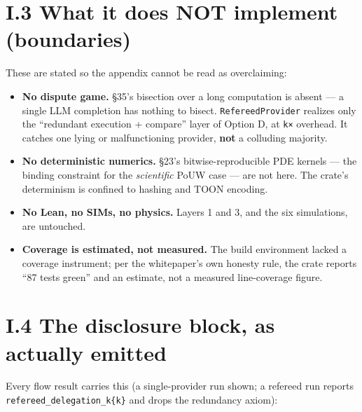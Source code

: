 \documentclass[
  11pt]{report}
\providecommand{\tightlist}{%
  \setlength{\itemsep}{0pt}\setlength{\parskip}{0pt}}
\begin{document}
\hypertarget{i.3-what-it-does-not-implement-boundaries}{%
\section{I.3 What it does NOT implement
(boundaries)}\label{i.3-what-it-does-not-implement-boundaries}}

These are stated so the appendix cannot be read as overclaiming:

\begin{itemize}
\tightlist
\item
  \textbf{No dispute game.} §35's bisection over a long computation is
  absent --- a single LLM completion has nothing to bisect.
  \texttt{RefereedProvider} realizes only the ``redundant execution +
  compare'' layer of Option D, at \texttt{k×} overhead. It catches one
  lying or malfunctioning provider, \textbf{not} a colluding majority.
\item
  \textbf{No deterministic numerics.} §23's bitwise-reproducible PDE
  kernels --- the binding constraint for the \emph{scientific} PoUW case
  --- are not here. The crate's determinism is confined to hashing and
  TOON encoding.
\item
  \textbf{No Lean, no SIMs, no physics.} Layers 1 and 3, and the six
  simulations, are untouched.
\item
  \textbf{Coverage is estimated, not measured.} The build environment
  lacked a coverage instrument; per the whitepaper's own honesty rule,
  the crate reports ``87 tests green'' and an estimate, not a measured
  line-coverage figure.
\end{itemize}

\hypertarget{i.4-the-disclosure-block-as-actually-emitted}{%
\section{I.4 The disclosure block, as actually
emitted}\label{i.4-the-disclosure-block-as-actually-emitted}}

Every flow result carries this (a single-provider run shown; a refereed
run reports \texttt{refereed\_delegation\_k\{k\}} and drops the
redundancy axiom):
\end{document}
